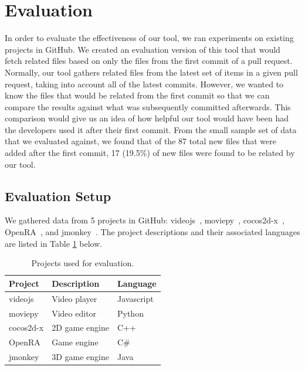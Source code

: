 
\section{Evaluation}
\label{sec:finding}

In order to evaluate the effectiveness of our tool, we ran experiments on existing projects in GitHub. We created an evaluation version of this tool that would fetch related files based on only the files from the first commit of a pull request. Normally, our tool gathers related files from the latest set of items in a given pull request, taking into account all of the latest commits. However, we wanted to know the files that would be related from the first commit so that we can compare the results against what was subsequently committed afterwards. This comparison would give us an idea of how helpful our tool would have been had the developers used it after their first commit. From the small sample set of data that we evaluated against, we found that of the 87 total new files that were added after the first commit, 17 (19.5\%) of new files were found to be related by our tool.

\subsection{Evaluation Setup}

We gathered data from 5 projects in GitHub: videojs~\cite{videojs}, moviepy~\cite{moviepy}, cocos2d-x~\cite{cocos2d-x}, OpenRA~\cite{OpenRA}, and jmonkey~\cite{jmonkey}. The project descriptions and their associated languages are listed in Table \ref{tab:evaluationprojects} below. 

\begin{table}[h]
\centering
\begin{tabular}{lll}
\hline
Project & Description & Language \\
\hline
videojs & Video player & Javascript \\
moviepy & Video editor & Python \\
cocos2d-x & 2D game engine & C++ \\
OpenRA & Game engine & C\# \\
jmonkey & 3D game engine & Java \\
\hline
\end{tabular}
\caption{Projects used for evaluation.}
\label{tab:evaluationprojects}
\end{table}

